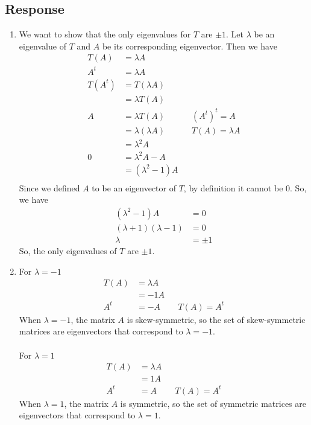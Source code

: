 \documentclass[13pt]{article}
\begin{document}
\subsection*{Response}
\begin{enumerate}[label=(\alph*),leftmargin=*]
\item We want to show that the only eigenvalues for $T$ are $\pm 1$. Let $\lambda$ be an eigenvalue of $T$ and $A$ be its corresponding eigenvector. Then we have
  \begin{align*}
    T(A) &= \lambda A \\
    A^t &= \lambda A \\
    T(A^t) &= T(\lambda A) \\
         &= \lambda T(A) \\
    A &= \lambda T(A) && (A^t)^t = A \\
         &= \lambda (\lambda A) && T(A) = \lambda A \\
         &= \lambda^2 A \\
    0 &= \lambda^2 A - A \\
         &= (\lambda^2 - 1)A \\
  \end{align*}
  Since we defined $A$ to be an eigenvector of $T$, by definition it cannot be $0$. So, we have
  \begin{align*}
    (\lambda^2 - 1)A &= 0 \\
    (\lambda + 1)(\lambda - 1) &= 0 \\
    \lambda &= \pm 1
  \end{align*}
  So, the only eigenvalues of $T$ are $\pm 1$.

\item For $\lambda = -1$
  \begin{align*}
    T(A) &= \lambda A \\
         &= -1A \\
    A^t &= -A && T(A) = A^t
  \end{align*}
  When $\lambda = -1$, the matrix $A$ is skew-symmetric, so the set of skew-symmetric matrices are eigenvectors that correspond to $\lambda = -1$. \\ \\
  For $\lambda = 1$
  \begin{align*}
    T(A) &= \lambda A \\
         &= 1A \\
    A^t &= A && T(A) = A^t
  \end{align*}
  When $\lambda = 1$, the matrix $A$ is symmetric, so the set of symmetric matrices are eigenvectors that correspond to $\lambda = 1$.


\end{enumerate}
\end{document}
